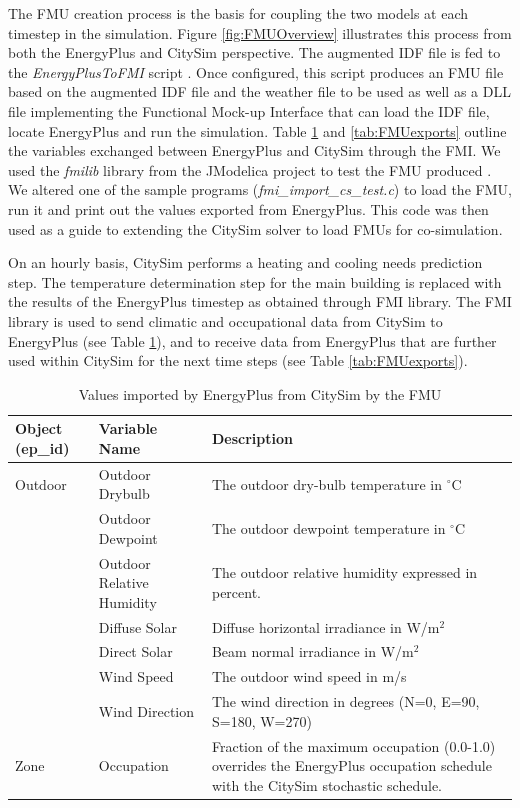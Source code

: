 \documentclass{tBPS2e}
\theoremstyle{plain}
\theoremstyle{definition}
\theoremstyle{remark}
\begin{document}
The FMU creation process is the basis for coupling the two models at each timestep in the simulation. Figure \ref{fig:FMUOverview} illustrates this process from both the EnergyPlus and CitySim perspective. The augmented IDF file is fed to the \emph{EnergyPlusToFMI} script \citep{Nouidui:2014bo}. Once configured, this script produces an FMU file based on the augmented IDF file and the weather file to be used as well as a DLL file implementing the Functional Mock-up Interface that can load the IDF file, locate EnergyPlus and run the simulation. Table \ref{tab:FMUimports} and \ref{tab:FMUexports} outline the variables exchanged between EnergyPlus and CitySim through the FMI. We used the \emph{fmilib} library from the JModelica project to test the FMU produced \citep{Anonymous:ZZTfF80-}. We altered one of the sample programs (\emph{fmi\_import\_cs\_test.c}) to load the FMU, run it and print out the values exported from EnergyPlus. This code was then used as a guide to extending the CitySim solver to load FMUs for co-simulation.

On an hourly basis, CitySim performs a heating and cooling needs prediction step. The temperature determination step for the main building is replaced with the results of the EnergyPlus timestep as obtained through FMI library. The FMI library is used to send climatic and occupational data from CitySim to EnergyPlus (see Table \ref{tab:FMUimports}), and to receive data from EnergyPlus that are further used within CitySim for the next time steps (see Table \ref{tab:FMUexports}).

\begin{table}
\centering
\caption{Values imported by EnergyPlus from CitySim by the FMU}
\label{tab:FMUimports}
\centering
\begin{tabular}{|p{1.3cm}|p{1.9cm}|p{3.2cm}|}
  \hline
  \bf{Object (ep\_id)} &  \bf{Variable Name} & \bf{Description} \\
    \hline
Outdoor & Outdoor Drybulb & The outdoor dry-bulb temperature in $^{\circ}\mathrm{C}$ \\
     \hline
 & Outdoor Dewpoint & The outdoor dewpoint temperature in $^{\circ}\mathrm{C}$ \\
     \hline
 & Outdoor Relative Humidity & The outdoor relative humidity expressed in percent. \\
     \hline
 & Diffuse Solar & Diffuse horizontal irradiance in W/m$^2$ \\
     \hline
 & Direct Solar & Beam normal irradiance in W/m$^2$ \\
     \hline
 & Wind Speed & The outdoor wind speed in m/s \\
     \hline
 & Wind Direction & The wind direction in degrees (N=0, E=90, S=180, W=270) \\
     \hline
Zone & Occupation & Fraction of the maximum occupation (0.0-1.0) overrides the EnergyPlus occupation schedule with the CitySim stochastic schedule. \\
    \hline
\end{tabular}
\end{table}
\end{document}
